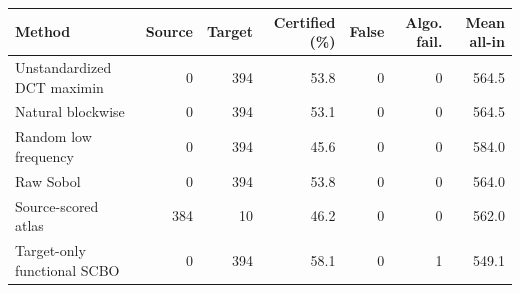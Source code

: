 \begin{tabular}{lrrrrrr}
\toprule
Method & Source & Target & Certified (\%) & False & Algo. fail. & Mean all-in \\
\midrule
Unstandardized DCT maximin & 0 & 394 & 53.8 & 0 & 0 & 564.5 \\
Natural blockwise & 0 & 394 & 53.1 & 0 & 0 & 564.5 \\
Random low frequency & 0 & 394 & 45.6 & 0 & 0 & 584.0 \\
Raw Sobol & 0 & 394 & 53.8 & 0 & 0 & 564.0 \\
Source-scored atlas & 384 & 10 & 46.2 & 0 & 0 & 562.0 \\
Target-only functional SCBO & 0 & 394 & 58.1 & 0 & 1 & 549.1 \\
\bottomrule
\end{tabular}
